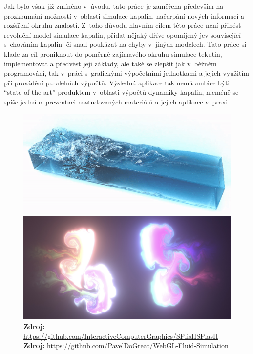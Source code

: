 Jak bylo však již zmíněno v~úvodu, tato práce je zaměřena především na prozkoumání možností v~oblasti simulace kapalin, načerpání nových informací a rozšíření okruhu znalostí. Z~toho důvodu hlavním cílem této práce není přinést revoluční model simulace kapalin, přidat nějaký dříve opomíjený jev související s~chováním kapalin, či snad poukázat na chyby v~jiných modelech. Tato práce si klade za cíl proniknout do poměrně zajímavého okruhu simulace tekutin, implementovat a předvést její základy, ale také se zlepšit jak v~běžném programování, tak v~práci s~grafickými výpočetními jednotkami a jejich využitím při provádění paralelních výpočtů. Výsledná aplikace tak nemá ambice býti \mbox{\enquote{state-of-the-art}} produktem v~oblasti výpočtů dynamiky kapalin, nicméně se spíše jedná o~prezentaci nastudovaných materiálů a jejich aplikace v~praxi.

\begin{figure}[h]\centering
	\centering
	\captionsetup{justification=centering}
	\includegraphics[width=0.5\linewidth]{obrazky-figures/splish-0.png}\hfill
	\includegraphics[width=0.5\linewidth]{obrazky-figures/webglFluid.jpg}\hfill
	\textbf{Zdroj: } \url{https://github.com/InteractiveComputerGraphics/SPlisHSPlasH} \newline
    \textbf{Zdroj: } \url{https://github.com/PavelDoGreat/WebGL-Fluid-Simulation}
	\label{fig:existingSolution}
\end{figure}

